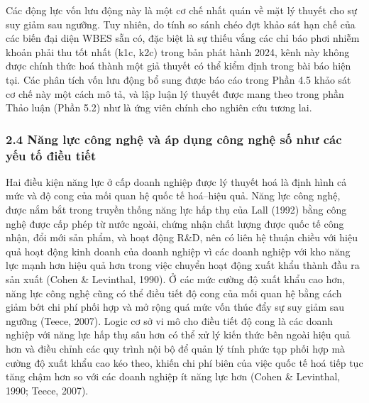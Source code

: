 \documentclass[12pt,a4paper]{article}
\begin{document}
Các động lực vốn lưu động này là một cơ chế nhất quán về mặt lý thuyết
cho sự suy giảm sau ngưỡng. Tuy nhiên, do tính so sánh chéo đợt khảo sát
hạn chế của các biến đại diện WBES sẵn có, đặc biệt là sự thiếu vắng các
chỉ báo phơi nhiễm khoản phải thu tốt nhất (k1c, k2c) trong bản phát
hành 2024, kênh này không được chính thức hoá thành một giả thuyết có
thể kiểm định trong bài báo hiện tại. Các phân tích vốn lưu động bổ sung
được báo cáo trong Phần 4.5 khảo sát cơ chế này một cách mô tả, và lập
luận lý thuyết được mang theo trong phần Thảo luận (Phần 5.2) như là ứng
viên chính cho nghiên cứu tương lai.

\hypertarget{24-nux103ng-lux1ef1c-cuxf4ng-nghux1ec7-vuxe0-uxe1p-dux1ee5ng-cuxf4ng-nghux1ec7-sux1ed1-nhux1b0-cuxe1c-yux1ebfu-tux1ed1-ux111iux1ec1u-tiux1ebft}{%
\subsubsection{2.4 Năng lực công nghệ và áp dụng công nghệ số như các
yếu tố điều
tiết}\label{24-nux103ng-lux1ef1c-cuxf4ng-nghux1ec7-vuxe0-uxe1p-dux1ee5ng-cuxf4ng-nghux1ec7-sux1ed1-nhux1b0-cuxe1c-yux1ebfu-tux1ed1-ux111iux1ec1u-tiux1ebft}}

Hai điều kiện năng lực ở cấp doanh nghiệp được lý thuyết hoá là định
hình cả mức và độ cong của mối quan hệ quốc tế hoá--hiệu quả. Năng lực
công nghệ, được nắm bắt trong truyền thống năng lực hấp thụ của Lall
(1992) bằng công nghệ được cấp phép từ nước ngoài, chứng nhận chất lượng
được quốc tế công nhận, đổi mới sản phẩm, và hoạt động R\&D, nên có liên
hệ thuận chiều với hiệu quả hoạt động kinh doanh của doanh nghiệp vì các
doanh nghiệp với kho năng lực mạnh hơn hiệu quả hơn trong việc chuyển
hoạt động xuất khẩu thành đầu ra sản xuất (Cohen \& Levinthal, 1990). Ở
các mức cường độ xuất khẩu cao hơn, năng lực công nghệ cũng có thể điều
tiết độ cong của mối quan hệ bằng cách giảm bớt chi phí phối hợp và mở
rộng quá mức vốn thúc đẩy sự suy giảm sau ngưỡng (Teece, 2007). Logic cơ
sở vi mô cho điều tiết độ cong là các doanh nghiệp với năng lực hấp thụ
sâu hơn có thể xử lý kiến thức bên ngoài hiệu quả hơn và điều chỉnh các
quy trình nội bộ để quản lý tính phức tạp phối hợp mà cường độ xuất khẩu
cao kéo theo, khiến chi phí biên của việc quốc tế hoá tiếp tục tăng chậm
hơn so với các doanh nghiệp ít năng lực hơn (Cohen \& Levinthal, 1990;
Teece, 2007).
\end{document}
